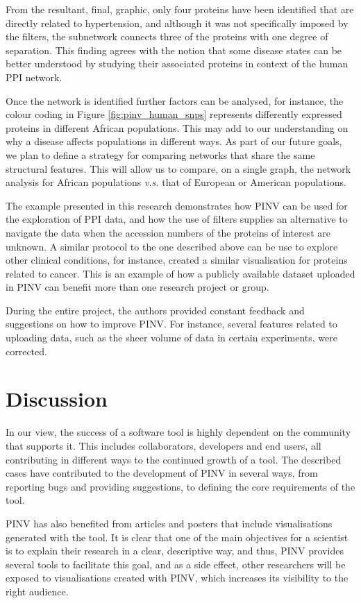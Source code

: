 From the resultant, final, graphic, only four proteins have been identified that are directly related to hypertension, and although it was not specifically imposed by the filters, the subnetwork connects three of the proteins with one degree of separation. This finding agrees with the notion that some disease states can be better understood by studying their associated proteins in context of the human PPI network.

Once the network is identified further factors can be analysed, for instance, the colour coding in Figure \ref{fig:pinv_human_snps} represents differently expressed proteins in different African populations. This may add to our understanding on why a disease affects populations in different ways. As part of our future goals, we plan to define a strategy for comparing networks that share the same structural features. This will allow us to compare, on a single graph, the network analysis for African populations \emph{v.s.} that of European or American populations. 

The example presented in this research demonstrates how PINV can be used for the exploration of PPI data, and how the use of filters supplies an alternative to navigate the data when the accession numbers of the proteins of interest are unknown. A similar protocol to the one described above can be use to explore other clinical conditions, for instance, \cite{HEE2014} created a similar visualisation for proteins related to cancer. This is an example of how a publicly available dataset uploaded in PINV can benefit more than one research project or group.

During the entire project, the authors provided constant feedback and suggestions on how to improve PINV. For instance, several features related to uploading data, such as the sheer volume of data in certain experiments, were corrected.

\section{Discussion}
In our view, the success of a software tool is highly dependent on the community that supports it.  This includes collaborators, developers and end users, all contributing in different ways to the continued growth of a tool. The described cases have contributed to the development of PINV in several ways, from reporting bugs and providing suggestions, to defining the core requirements of the tool. 

PINV has also benefited from articles and posters that include visualisations generated with the tool. It is clear that one of the main objectives for  a scientist is to explain their research in a clear, descriptive way, and thus, PINV provides several tools to facilitate this goal, and as a side effect, other researchers will be exposed to visualisations created with PINV, which increases its visibility to the right audience. 

